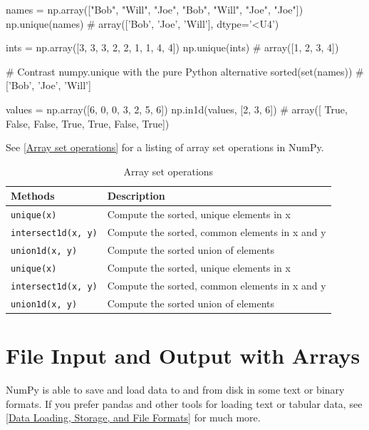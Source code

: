 \begin{pyc}
names = np.array(["Bob", "Will", "Joe", "Bob", "Will", "Joe", "Joe"])
np.unique(names)
# array(['Bob', 'Joe', 'Will'], dtype='<U4')

ints = np.array([3, 3, 3, 2, 2, 1, 1, 4, 4])
np.unique(ints)
# array([1, 2, 3, 4])

# Contrast numpy.unique with the pure Python alternative
sorted(set(names))
# ['Bob', 'Joe', 'Will']

values = np.array([6, 0, 0, 3, 2, 5, 6])
np.in1d(values, [2, 3, 6])
# array([ True, False, False,  True,  True, False,  True])
\end{pyc}

See \autoref{Array set operations} for a listing of array set operations in NumPy.

\begin{table}
    \caption{Array set operations}
    \label{Array set operations}
    \begin{tabularx}{\textwidth}{lX}
        \hline
        Methods                  & Description                                    \\
        \hline
        \verb|unique(x)|         & Compute the sorted, unique elements in x       \\
        \verb|intersect1d(x, y)| & Compute the sorted, common elements in x and y \\
        \verb|union1d(x, y)|     & Compute the sorted union of elements           \\
        \verb|unique(x)|         & Compute the sorted, unique elements in x       \\
        \verb|intersect1d(x, y)| & Compute the sorted, common elements in x and y \\
        \verb|union1d(x, y)|     & Compute the sorted union of elements           \\
        \hline
    \end{tabularx}
\end{table}
\section{File Input and Output with Arrays}
NumPy is able to save and load data to and from disk in some text or binary formats. If you prefer pandas and other tools for loading text or tabular data, see \autoref{Data Loading, Storage, and File Formats} for much more.

